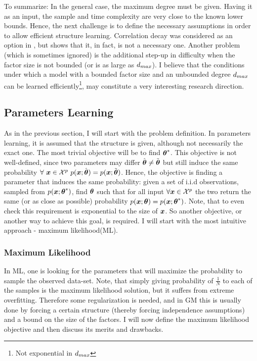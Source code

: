 To summarize: 
In the general case, the maximum degree must be given. Having it as an input, the sample and time complexity are very close to the known lower bounds. 
Hence, the next challenge is to define the necessary assumptions in order to allow efficient structure learning. 
Correlation decay was considered as an option in \cite{montanari2009graphical}, but \cite{bresler2014structure} shows that it, in fact, is not a necessary one. 
Another problem (which is sometimes ignored) is the additional step-up in difficulty when the factor size is not bounded (or is as large as $d_{max}$). 
I believe that the conditions under which a model with a bounded factor size and an unbounded degree $d_{max}$ can be learned efficiently\footnote{Not exponential in $d_{max}$}, may constitute a very interesting research direction.

\subsection{Parameters Learning}
As in the previous section, I will start with the problem definition. 
In parameters learning, it is assumed that the structure is given, although not necessarily the exact one.
The most trivial objective will be to find ${\boldsymbol{\theta}}^{*}$.  
This objective is not well-defined, since two parameters may differ $\hat{\boldsymbol{\theta}} \neq \tilde{\boldsymbol{\theta}}$ but still induce the same probability $\forall\ \xx \in \cX^p\ p(\xx;\hat{\thetav}) = p(\xx;\tilde{\thetav})$.
Hence, the objective is finding a parameter that induces the same probability: given a set of i.i.d observations, sampled from $p(\boldsymbol{x};{\boldsymbol{\theta}}^{*})$, find $\boldsymbol{\theta}$ such that for all input $\forall \boldsymbol{x} \in {\cal X}^{p}$ the two return the same (or as close as possible) probability $p(\boldsymbol{x};\boldsymbol{\theta}) = p(\boldsymbol{x};{\boldsymbol{\theta}}^{*})$.
Note, that to even check this requirement is exponential to the size of $\boldsymbol{x}$.
So another objective, or another way to achieve this goal, is required.
I will start with the  most intuitive approach - maximum likelihood(ML).

\subsubsection{Maximum Likelihood}
\label{sec:max_likelihood}
In ML, one is looking for the parameters that will maximize the probability to sample the observed data-set.
Note, that simply giving probability of $\frac{1}{N}$ to each of the samples is the maximum likelihood solution, but it suffers from extreme overfitting.
Therefore some regularization is needed, and in GM this is usually done by forcing a certain structure (thereby forcing independence assumptions) and a bound on the size of the factors.
I will now define the maximum likelihood objective and then discuss its merits and drawbacks.

